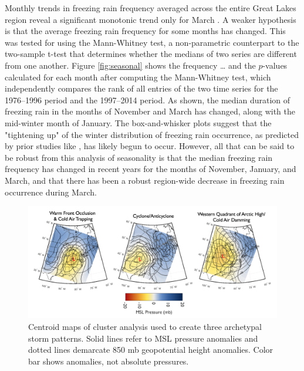 \documentclass[twocol]{ametsoc}
\begin{document}
Monthly trends in freezing rain frequency averaged across the entire Great Lakes region reveal a significant monotonic trend only for March . A weaker hypothesis is that the average freezing rain frequency for some months has changed. This was tested for using the Mann-Whitney test, a non-parametric counterpart to the two-sample t-test that determines whether the medians of two series are different from one another. Figure \ref{fig:seasonal} shows the frequency … and the $p$-values calculated for each month after computing the Mann-Whitney test, which independently compares the rank of all entries of the two time series for the 1976--1996 period and the 1997--2014 period. As shown, the median duration of freezing rain in the months of November and March has changed, along with the mid-winter month of January. The box-and-whisker plots suggest that the "tightening up" of the winter distribution of freezing rain occurrence, as predicted by prior studies like \citet{cheng2011possible}, has likely begun to occur. However, all that can be said to be robust from this analysis of seasonality is that the median freezing rain frequency has changed in recent years for the months of November, January, and March, and that there has been a robust region-wide decrease in freezing rain occurrence during March.

\begin{figure}
\centering
\includegraphics[width=1\textwidth]{Cluster_Centroids.png}
\caption{\label{fig:centroids} Centroid maps of cluster analysis  used to create three archetypal storm patterns. Solid lines refer to MSL pressure anomalies and dotted lines demarcate 850 mb geopotential height anomalies. Color bar shows anomalies, not absolute pressures.}
\end{figure}
\end{document}
